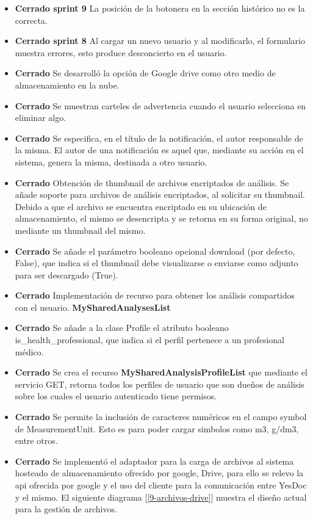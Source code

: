 \begin{itemize}
\begin{itemize}
 			\item \textbf{Cerrado sprint 9} La posición de la botonera en la sección histórico no es la correcta.		         										
 			\item \textbf{Cerrado sprint 8} Al cargar un nuevo usuario y al modificarlo, el formulario muestra errores, esto produce desconcierto en el usuario.
		        \item \textbf{Cerrado} Se desarrolló la opción de Google drive como otro medio de almacenamiento en la nube.
		        \item \textbf{Cerrado } Se muestran carteles de advertencia cuando el usuario selecciona en eliminar algo.
		   \item \textbf{Cerrado} Se especifica, en el título de la notificación, el autor responsable de la misma.  El autor de una notificación es aquel que, mediante su acción en el sistema, genera la misma, destinada a otro usuario.
		   \item \textbf{Cerrado} Obtención de thumbnail de archivos encriptados de análisis. Se añade soporte para archivos de análisis encriptados, al solicitar su thumbnail. Debido a que el archivo se encuentra encriptado en su ubicación de almacenamiento, el mismo se desencripta y se retorna en su forma original, no mediante un thumbnail del mismo.
		   \item \textbf{Cerrado} Se añade el parámetro booleano opcional download (por defecto, False), que indica si el thumbnail debe visualizarse o enviarse como adjunto para ser descargado (True).
		   \item \textbf{Cerrado} Implementación de recurso para obtener los análisis compartidos con el usuario. \textbf{MySharedAnalysesList}
		   \item \textbf{Cerrado} Se añade a la clase Profile el atributo booleano is\_health\_professional, que indica si el perfil pertenece a un profesional médico.
		   \item \textbf{Cerrado} Se crea el recurso \textbf{MySharedAnalysisProfileList} que mediante el servicio GET, retorna todos los perfiles de usuario que son dueños de análisis sobre los cuales el usuario autenticado tiene permisos. 
		   \item \textbf{Cerrado} Se permite la inclusión de caracteres numéricos en el campo symbol de MeasurementUnit. Esto es para poder cargar simbolos como m3, g/dm3, entre otros.
		   \item \textbf{Cerrado} Se implementó el adaptador para la carga de archivos al sistema hosteado de almacenamiento ofrecido por google, Drive, para ello se relevo la api ofrecida por google y el uso del cliente para la comunicación entre YesDoc y el mismo. El siguiente diagrama [\ref{9-archivos-drive}] muestra el diseño actual para la gestión de archivos.   
 		\end{itemize}
 		

\end{itemize}
